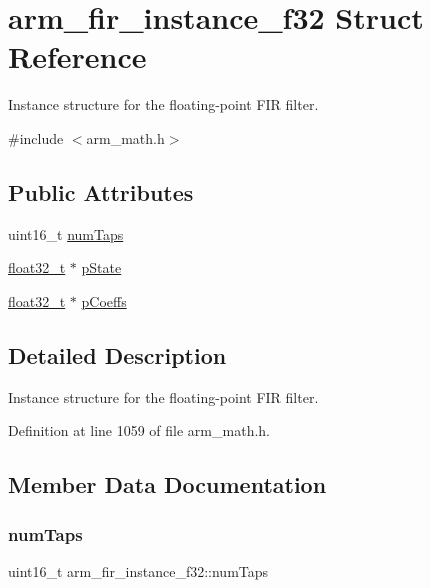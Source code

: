 \hypertarget{structarm__fir__instance__f32}{}\section{arm\+\_\+fir\+\_\+instance\+\_\+f32 Struct Reference}
\label{structarm__fir__instance__f32}


Instance structure for the floating-\/point F\+IR filter.  




{\ttfamily \#include $<$arm\+\_\+math.\+h$>$}

\subsection*{Public Attributes}
\begin{DoxyCompactItemize}
\item 
uint16\+\_\+t \hyperlink{structarm__fir__instance__f32_a20cf98c92b5323799b7881c9ff4d2f7c}{num\+Taps}
\item 
\hyperlink{arm__math_8h_a4611b605e45ab401f02cab15c5e38715}{float32\+\_\+t} $\ast$ \hyperlink{structarm__fir__instance__f32_a7afcf4022e8560db9b8fd28b0d090a15}{p\+State}
\item 
\hyperlink{arm__math_8h_a4611b605e45ab401f02cab15c5e38715}{float32\+\_\+t} $\ast$ \hyperlink{structarm__fir__instance__f32_a1c9cfca901d5902afeb640f2831488f4}{p\+Coeffs}
\end{DoxyCompactItemize}


\subsection{Detailed Description}
Instance structure for the floating-\/point F\+IR filter. 

Definition at line 1059 of file arm\+\_\+math.\+h.



\subsection{Member Data Documentation}
\mbox{\label{structarm__fir__instance__f32_a20cf98c92b5323799b7881c9ff4d2f7c}} 
\subsubsection{\texorpdfstring{num\+Taps}{numTaps}}
{\footnotesize\ttfamily uint16\+\_\+t arm\+\_\+fir\+\_\+instance\+\_\+f32\+::num\+Taps}

